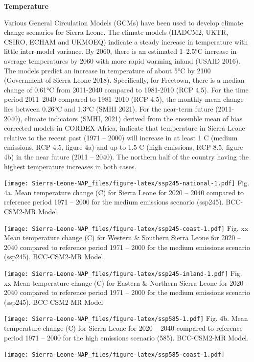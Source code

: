 \documentclass[
]{book}
\begin{document}
\textbf{Temperature}

Various General Circulation Models (GCMs) have been used to develop climate change scenarios for Sierra Leone. The climate models (HADCM2, UKTR, CSIRO, ECHAM and UKMOEQ) indicate a steady increase in temperature with little inter-model variance. By 2060, there is an estimated 1--2.5°C increase in average temperatures by 2060 with more rapid warming inland (USAID 2016). The models predict an increase in temperature of about 5°C by 2100 (Government of Sierra Leone 2018). Specifically, for Freetown, there is a median change of 0.61°C from 2011-2040 compared to 1981-2010 (RCP 4.5). For the time period 2011--2040 compared to 1981--2010 (RCP 4.5), the monthly mean change lies between 0.26°C and 1.3°C (SMHI 2021).
For the near-term future (2011-2040), climate indicators (SMHI, 2021) derived from the ensemble mean of bias corrected models in CORDEX Africa, indicate that temperature in Sierra Leone relative to the recent past (1971 -- 2000) will increase in at least 1 C (medium emissions, RCP 4.5, figure 4a) and up to 1.5 C (high emissions, RCP 8.5, figure 4b) in the near future (2011 -- 2040). The northern half of the country having the highest temperature increases in both cases.

\texttt{[image: Sierra-Leone-NAP\_files/figure-latex/ssp245-national-1.pdf]}
Fig. 4a. Mean temperature change (C) for Sierra Leone for 2020 -- 2040 compared to reference period 1971 -- 2000 for the medium emissions scenario (ssp245). BCC-CSM2-MR Model

\texttt{[image: Sierra-Leone-NAP\_files/figure-latex/ssp245-coast-1.pdf]}
Fig. xx Mean temperature change (C) for Western \& Southern Sierra Leone for 2020 -- 2040 compared to reference period 1971 -- 2000 for the medium emissions scenario (ssp245). BCC-CSM2-MR Model

\texttt{[image: Sierra-Leone-NAP\_files/figure-latex/ssp245-inland-1.pdf]}
Fig. xx Mean temperature change (C) for Eastern \& Northern Sierra Leone for 2020 -- 2040 compared to reference period 1971 -- 2000 for the medium emissions scenario (ssp245). BCC-CSM2-MR Model

\texttt{[image: Sierra-Leone-NAP\_files/figure-latex/ssp585-1.pdf]}
Fig. 4b. Mean temperature change (C) for Sierra Leone for 2020 -- 2040 compared to reference period 1971 -- 2000 for the high emissions scenario (585). BCC-CSM2-MR Model.

\texttt{[image: Sierra-Leone-NAP\_files/figure-latex/ssp585-coast-1.pdf]}
\end{document}
